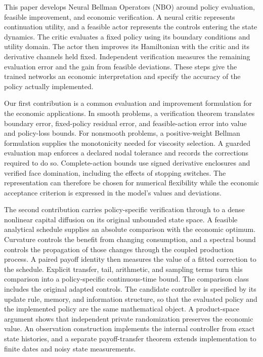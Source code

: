 \documentclass[ecta,nameyear,draft]{econsocart}
\theoremstyle{definition}
\theoremstyle{remark}
\begin{document}
This paper develops Neural Bellman Operators (NBO) around policy evaluation, feasible improvement, and economic verification. A neural critic represents continuation utility, and a feasible actor represents the controls entering the state dynamics. The critic evaluates a fixed policy using its boundary conditions and utility domain. The actor then improves its Hamiltonian with the critic and its derivative channels held fixed. Independent verification measures the remaining evaluation error and the gain from feasible deviations. These steps give the trained networks an economic interpretation and specify the accuracy of the policy actually implemented.

Our first contribution is a common evaluation and improvement formulation for the economic applications. In smooth problems, a verification theorem translates boundary error, fixed-policy residual error, and feasible-action error into value and policy-loss bounds. For nonsmooth problems, a positive-weight Bellman formulation supplies the monotonicity needed for viscosity selection. A guarded evaluation map enforces a declared nodal tolerance and records the corrections required to do so. Complete-action bounds use signed derivative enclosures and verified face domination, including the effects of stopping switches. The representation can therefore be chosen for numerical flexibility while the economic acceptance criterion is expressed in the model's values and deviations.

The second contribution carries policy-specific verification through to a dense nonlinear capital diffusion on its original unbounded state space. A feasible analytical schedule supplies an absolute comparison with the economic optimum. Curvature controls the benefit from changing consumption, and a spectral bound controls the propagation of those changes through the coupled production process. A paired payoff identity then measures the value of a fitted correction to the schedule. Explicit transfer, tail, arithmetic, and sampling terms turn this comparison into a policy-specific continuous-time bound. The comparison class includes the original adapted controls. The candidate controller is specified by its update rule, memory, and information structure, so that the evaluated policy and the implemented policy are the same mathematical object. A product-space argument shows that independent private randomization preserves the economic value. An observation construction implements the internal controller from exact state histories, and a separate payoff-transfer theorem extends implementation to finite dates and noisy state measurements.
\end{document}
